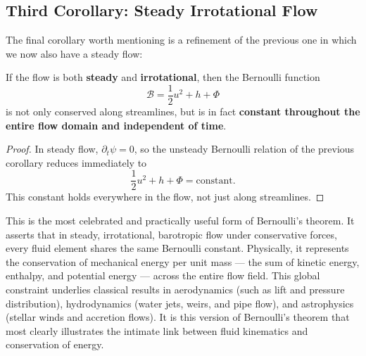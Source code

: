 \subsection{Third Corollary: Steady Irrotational Flow}

The final corollary worth mentioning is a refinement of the previous one in which we now also have a steady flow:
\vspace{0.5cm}
\begin{corollary}
If the flow is both \textbf{steady} and \textbf{irrotational}, then the Bernoulli function
\[
\mathcal{B} = \frac{1}{2}u^2 + h + \Phi
\]
is not only conserved along streamlines, but is in fact \textbf{constant throughout the entire flow domain and independent of time}.
\end{corollary}

\begin{proof}
In steady flow, $\partial_t \psi = 0$, so the unsteady Bernoulli relation of the previous corollary reduces immediately to
\[
\frac{1}{2}u^2 + h + \Phi = \text{constant}.
\]
This constant holds everywhere in the flow, not just along streamlines.
\end{proof}
\vspace{0.5cm}

This is the most celebrated and practically useful form of Bernoulli’s theorem. It asserts that in steady, irrotational, barotropic flow under conservative forces, every fluid element shares the same Bernoulli constant. Physically, it represents the conservation of mechanical energy per unit mass — the sum of kinetic energy, enthalpy, and potential energy — across the entire flow field. This global constraint underlies classical results in aerodynamics (such as lift and pressure distribution), hydrodynamics (water jets, weirs, and pipe flow), and astrophysics (stellar winds and accretion flows). It is this version of Bernoulli’s theorem that most clearly illustrates the intimate link between fluid kinematics and conservation of energy.

